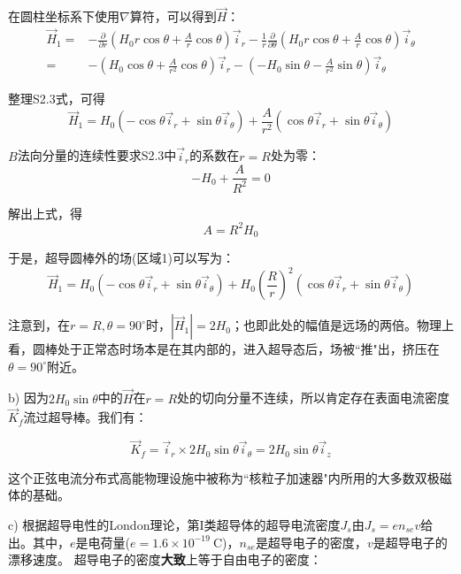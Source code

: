 在圆柱坐标系下使用$\nabla$算符，可以得到$\vec{H}$：
\begin{align}
\vec{H}_1=&-\frac{\partial}{\partial r}(H_0 r \cos\theta +\frac{A}{r}\cos\theta)\vec{i}_r-\frac{1}{r}\frac{\partial}{\partial \theta}(H_0 r \cos\theta +\frac{A}{r}\cos\theta)\vec{i}_\theta \tag{S2.2}\\
=&-(H_0 \cos\theta +\frac{A}{r^2}\cos\theta)\vec{i}_r-(-H_0 \sin\theta -\frac{A}{r^2}\sin\theta)\vec{i}_\theta \tag{S2.3}
\end{align}

整理S2.3式，可得
\begin{equation*}
\vec{H}_1=H_0(-\cos \theta \vec{i}_r+\sin \theta \vec{i}_\theta) +\frac{A}{r^2}(\cos\theta \vec{i}_r+\sin\theta \vec{i}_\theta )\tag{S2.4}
\end{equation*}

$B$法向分量的连续性要求S2.3中$\vec{i}_r$的系数在$r=R$处为零：
\begin{equation*}
-H_0+\frac{A}{R^2}=0  \tag{S2.5}
\end{equation*}

解出上式，得
\begin{equation*}
A=R^2 H_0 \tag{S2.6}
\end{equation*}

于是，超导圆棒外的场(区域1)可以写为：
\begin{equation*}
\vec{H}_1=H_0(-\cos \theta \vec{i}_r+\sin \theta \vec{i}_\theta) +H_0 \left(\frac{R}{r}\right)^2(\cos\theta \vec{i}_r+\sin\theta \vec{i}_\theta ) \tag{2.42}
\end{equation*}

注意到，在$r=R,\theta=90^\circ$时，$|\vec{H}_1|=2H_0$；也即此处的幅值是远场的两倍。物理上看，圆棒处于正常态时场本是在其内部的，进入超导态后，场被``推"出，挤压在$\theta=90^\circ$附近。


b) 因为$2H_0\sin \theta$中的$\vec{H}$在$r=R$处的切向分量不连续，所以肯定存在表面电流密度$\vec{K}_f$流过超导棒。我们有：

\begin{equation*}
  \vec{K}_f=\vec{i}_r \times 2H_0\sin\theta \vec{i}_\theta=2H_0\sin\theta\vec{i}_z\tag{2.43}
\end{equation*}

这个正弦电流分布式高能物理设施中被称为``核粒子加速器"内所用的大多数双极磁体的基础。


c) 根据超导电性的London理论，第I类超导体的超导电流密度$J_s$由$J_s=en_{se}v$给出。其中，$e$是电荷量($e=1.6\times 10^{-19}\ \mathrm{C}$)，$n_{se}$是超导电子的密度，$v$是超导电子的漂移速度。
超导电子的密度\textbf{大致}上等于自由电子的密度：

